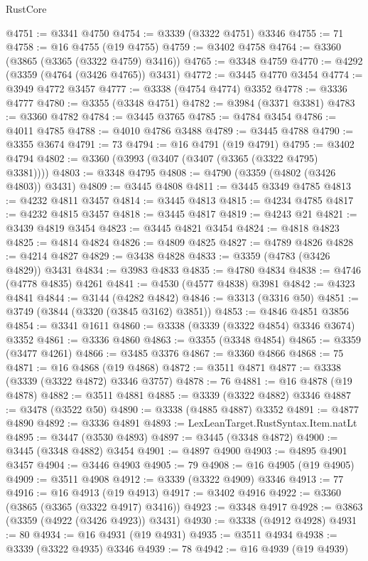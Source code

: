 \begin{lexlean}{RustCore}
\begin{coremodule}
@4751 := @3341 @4750
@4754 := @3339 (@3322 @4751) @3346
@4755 := 71
@4758 := @16 @4755 (@19 @4755)
@4759 := @3402 @4758
@4764 := @3360 (@3865 (@3365 (@3322 @4759) @3416))
@4765 := @3348 @4759
@4770 := @4292 (@3359 (@4764 (@3426 @4765)) @3431)
@4772 := @3445 @4770 @3454
@4774 := @3949 @4772 @3457
@4777 := @3338 (@4754 @4774) @3352
@4778 := @3336 @4777
@4780 := @3355 (@3348 @4751)
@4782 := @3984 (@3371 @3381)
@4783 := @3360 @4782
@4784 := @3445 @3765
@4785 := @4784 @3454
@4786 := @4011 @4785
@4788 := @4010 @4786 @3488
@4789 := @3445 @4788
@4790 := @3355 @3674
@4791 := 73
@4794 := @16 @4791 (@19 @4791)
@4795 := @3402 @4794
@4802 := @3360 (@3993 (@3407 (@3407 (@3365 (@3322 @4795) @3381))))
@4803 := @3348 @4795
@4808 := @4790 (@3359 (@4802 (@3426 @4803)) @3431)
@4809 := @3445 @4808
@4811 := @3445 @3349 @4785
@4813 := @4232 @4811 @3457
@4814 := @3445 @4813
@4815 := @4234 @4785
@4817 := @4232 @4815 @3457
@4818 := @3445 @4817
@4819 := @4243 @21
@4821 := @3439 @4819 @3454
@4823 := @3445 @4821 @3454
@4824 := @4818 @4823
@4825 := @4814 @4824
@4826 := @4809 @4825
@4827 := @4789 @4826
@4828 := @4214 @4827
@4829 := @3438 @4828
@4833 := @3359 (@4783 (@3426 @4829)) @3431
@4834 := @3983 @4833
@4835 := @4780 @4834
@4838 := @4746 (@4778 @4835) @4261
@4841 := @4530 (@4577 @4838) @3981
@4842 := @4323 @4841
@4844 := @3144 (@4282 @4842)
@4846 := @3313 (@3316 @50)
@4851 := @3749 (@3844 (@3320 (@3845 @3162) @3851))
@4853 := @4846 @4851 @3856
@4854 := @3341 @1611
@4860 := @3338 (@3339 (@3322 @4854) @3346 @3674) @3352
@4861 := @3336 @4860
@4863 := @3355 (@3348 @4854)
@4865 := @3359 (@3477 @4261)
@4866 := @3485 @3376
@4867 := @3360 @4866
@4868 := 75
@4871 := @16 @4868 (@19 @4868)
@4872 := @3511 @4871
@4877 := @3338 (@3339 (@3322 @4872) @3346 @3757)
@4878 := 76
@4881 := @16 @4878 (@19 @4878)
@4882 := @3511 @4881
@4885 := @3339 (@3322 @4882) @3346
@4887 := @3478 (@3522 @50)
@4890 := @3338 (@4885 @4887) @3352
@4891 := @4877 @4890
@4892 := @3336 @4891
@4893 := LexLeanTarget.RustSyntax.Item.natLt
@4895 := @3447 (@3530 @4893)
@4897 := @3445 (@3348 @4872)
@4900 := @3445 (@3348 @4882) @3454
@4901 := @4897 @4900
@4903 := @4895 @4901 @3457
@4904 := @3446 @4903
@4905 := 79
@4908 := @16 @4905 (@19 @4905)
@4909 := @3511 @4908
@4912 := @3339 (@3322 @4909) @3346
@4913 := 77
@4916 := @16 @4913 (@19 @4913)
@4917 := @3402 @4916
@4922 := @3360 (@3865 (@3365 (@3322 @4917) @3416))
@4923 := @3348 @4917
@4928 := @3863 (@3359 (@4922 (@3426 @4923)) @3431)
@4930 := @3338 (@4912 @4928)
@4931 := 80
@4934 := @16 @4931 (@19 @4931)
@4935 := @3511 @4934
@4938 := @3339 (@3322 @4935) @3346
@4939 := 78
@4942 := @16 @4939 (@19 @4939)

\end{coremodule}
\end{lexlean}
